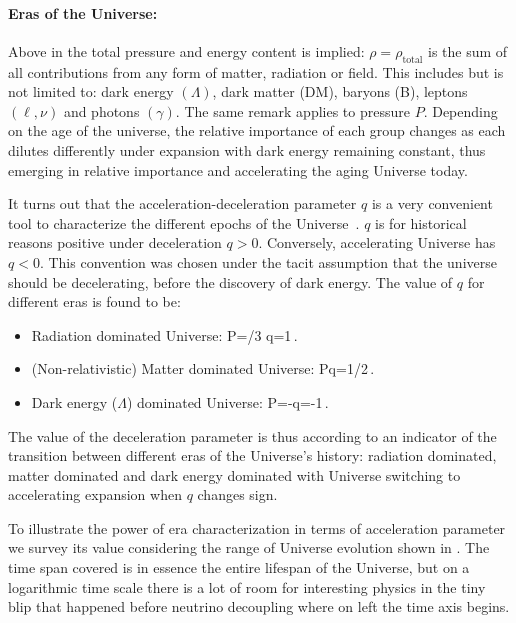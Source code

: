 \paragraph{Eras of the Universe:} %
Above in  the total pressure and energy content is implied: $\rho=\rho_\mathrm{total}$ is the sum of all contributions from any form of matter, radiation or field. This includes but is not limited to: dark energy $(\Lambda)$, dark matter (DM), baryons (B), leptons $(\ell,\nu)$ and photons $(\gamma)$. The same remark applies to pressure $P$. Depending on the age of the universe, the relative importance of each group changes as each dilutes differently under expansion with dark energy remaining constant, thus emerging in relative importance and accelerating the aging Universe today. 

It turns out that the acceleration-deceleration parameter $q$  is a very convenient tool to characterize the different epochs of the Universe~\cite{Rafelski:2013yka}. $q$ is for historical reasons positive under deceleration $q>0$. Conversely, accelerating Universe has $q<0$. This convention was chosen under the tacit assumption that the universe should be decelerating, before the discovery of dark energy. The value of $q$ for different eras is found to be:
\begin{itemize}
\item Radiation dominated Universe: 
P=\rho/3 \implies q=1\,.
\eeqn
\item (Non-relativistic) Matter dominated Universe: 
P\ll\rho \implies q=1/2\,.
\eeqn
\item Dark energy ($\Lambda$) dominated Universe: 
P=-\rho \implies q=-1\,.
\eeqn
\end{itemize}
The value of the deceleration parameter is thus according to  an indicator of the transition between different eras of the Universe's history: radiation dominated, matter dominated and dark energy dominated with Universe switching to accelerating expansion when $q$ changes sign.

To illustrate the power of era characterization in terms of acceleration parameter we survey its value considering the range of Universe evolution shown in . The time span covered  is in essence the entire lifespan of the Universe, but on a logarithmic time scale there is a lot of room for interesting physics in the tiny blip that happened before neutrino decoupling where on left the time axis begins. 

